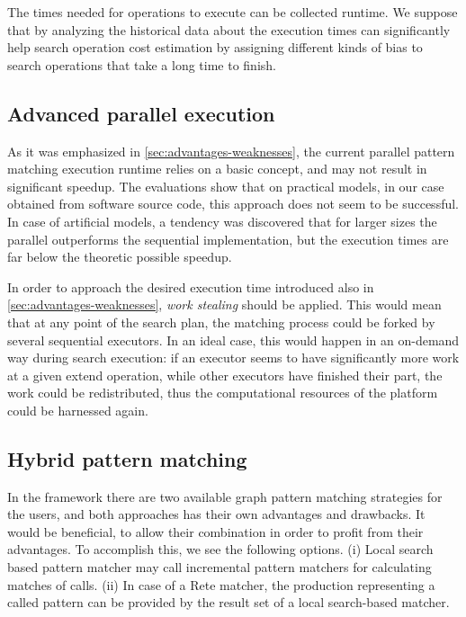 The times needed for operations to execute can be collected runtime. We suppose that by analyzing the historical data about the execution times can significantly help search operation cost estimation by assigning different kinds of bias to search operations that take a long time to finish.


\subsection{Advanced parallel execution}

As it was emphasized in \autoref{sec:advantages-weaknesses}, the current parallel pattern matching execution runtime relies on a basic concept, and may not result in significant speedup. The evaluations show that on practical models, in our case obtained from software source code, this approach does not seem to be successful. In case of artificial models, a tendency was discovered that for larger sizes the parallel outperforms the sequential implementation, but the execution times are far below the theoretic possible speedup.

In order to approach the desired execution time introduced also in \autoref{sec:advantages-weaknesses}, \emph{work stealing} should be applied. This would mean that at any point of the search plan, the matching process could be forked by several sequential executors. In an ideal case, this would happen in an on-demand way during search execution: if an executor seems to have significantly more work at a given extend operation, while other executors have finished their part, the work could be redistributed, thus the computational resources of the platform could be harnessed again.

\subsection{Hybrid pattern matching}

In the \eiq framework there are two available graph pattern matching strategies for the users, and both approaches has their own advantages and drawbacks. It would be beneficial, to allow their combination in order to profit from their advantages. To accomplish this, we see the following options. (i) Local search based pattern matcher may call incremental pattern matchers for calculating matches of calls. (ii) In case of a Rete matcher, the production representing a called pattern can be provided by the result set of a local search-based matcher.